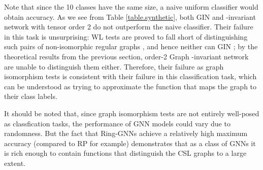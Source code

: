 \documentclass{article}
\begin{document}
Note that since the 10 classes have the same size, a naive uniform classifier would obtain  accuracy. As we see from Table \ref{table.synthetic}, both GIN and -invariant network with tensor order 2 do not outperform the naive classifier. Their failure in this task is unsurprising: WL tests are proved to fall short of distinguishing such pairs of non-isomorphic regular graphs \cite{cai1992optimal}, and hence neither can GIN \cite{xu2018powerful}; by the theoretical results from the previous section, order-2 Graph -invariant network are unable to distinguish them either. Therefore, their failure as graph isomorphism tests is consistent with their failure in this classification task, which can be understood as trying to approximate the function that maps the graph to their class labels.

It should be noted that, since graph isomorphism tests are not entirely well-posed as classfication tasks, the performance of GNN models could vary due to randomness. But the fact that Ring-GNNs achieve a relatively high maximum accuracy (compared to RP for example) demonstrates that as a class of GNNs it is rich enough to contain functions that distinguish the CSL graphs to a large extent. 
\end{document}
